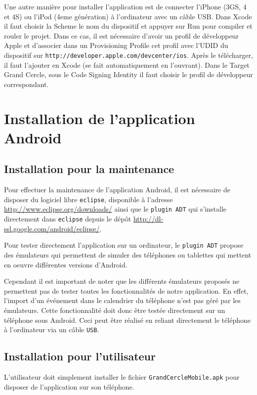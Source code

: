 \documentclass[a4paper, 11px]{article}
\begin{document}
Une autre manière pour installer l'application est de connecter l'iPhone (3GS, 4 et 4S) ou l'iPod (4eme génération) à l'ordinateur avec un câble USB. Dans Xcode il faut choisir la Scheme le nom du dispositif et appuyer sur Run pour compiler et rouler le projet.
Dans ce cas, il est nécessaire d'avoir un profil de développeur Apple et d'associer dans un Provisioning Profile cet profil avec l'UDID du dispositif sur \texttt{http://developer.apple.com/devcenter/ios}. Après le télécharger, il faut l'ajouter en Xcode (se fait automatiquement en l'ouvrant). Dans le Target Grand Cercle, sous le Code Signing Identity il faut choisir le profil de développeur correspondant.


\section{Installation de l'application Android}
\subsection{Installation pour la maintenance}
Pour effectuer la maintenance de l'application Android, il est nécessaire de disposer du logiciel libre \texttt{eclipse}, disponible à l'adresse \href{http://www.eclipse.org/downloads/}{http://www.eclipse.org/downloads/} ainsi que le \texttt{plugin ADT} qui s'installe directement dans \texttt{eclipse} depuis le dépôt \href{http://dl-ssl.google.com/android/eclipse/}{http://dl-ssl.google.com/android/eclipse/}.

Pour tester directement l'application sur un ordinateur, le \texttt{plugin ADT} propose des émulateurs qui permettent de simuler des téléphones ou tablettes qui mettent en oeuvre différentes versions d'Android.

Cependant il est important de noter que les différents émulateurs proposés ne permettent pas de tester toutes les fonctionnalités de notre application. En effet, l'import d'un événement dans le calendrier du téléphone n'est pas géré par les émulateurs. Cette fonctionnalité doit donc être testée directement sur un téléphone sous Android. Ceci peut être réalisé en reliant directement le téléphone à l'ordinateur via un câble \texttt{USB}.
\subsection{Installation pour l'utilisateur}
L'utilisateur doit simplement installer le fichier \texttt{GrandCercleMobile.apk} pour disposer de l'application sur son téléphone.
\end{document}
